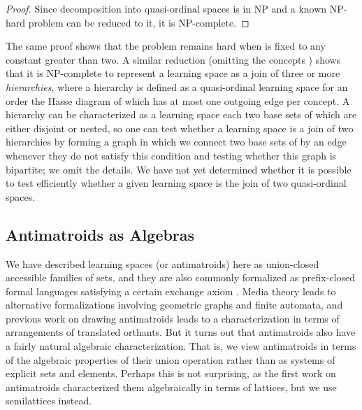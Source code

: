 \documentclass[11pt]{llncs}
\begin{document}
{\begin{proof}
Since decomposition into  quasi-ordinal spaces is in NP and a known NP-hard problem can be reduced to it, it is NP-complete.
\end{proof}

The same proof shows that the problem remains hard when  is fixed to any constant greater than two. A similar reduction (omitting the concepts ) shows that it is NP-complete to represent a learning space as a join of three or more \emph{hierarchies}, where a hierarchy is defined as a quasi-ordinal learning space for an order the Hasse diagram of which has at most one outgoing edge per concept. A hierarchy can be characterized as a learning space each two base sets of which are either disjoint or nested, so one can test whether a learning space  is a join of two hierarchies by forming a graph in which we connect two base sets of  by an edge whenever they do not satisfy this condition and testing whether this graph is bipartite; we omit the details. We have not yet determined whether it is possible to test efficiently whether a given learning space is the join of two quasi-ordinal spaces.

\subsection{Antimatroids as Algebras}

We have described learning spaces (or antimatroids) here as union-closed accessible families of sets, and they are also commonly formalized as prefix-closed formal languages satisfying a certain exchange axiom \citep{KorLovSch-91}. Media theory \citep{falma02,eppst07b} leads to alternative formalizations involving geometric graphs and finite automata, and previous work on drawing antimatroids \citep{eppst06} leads to a characterization in terms of arrangements of translated orthants. But it turns out that antimatroids also have a fairly natural algebraic characterization. That is, we view antimatroids in terms of the algebraic properties of their union operation rather than as systems of explicit sets and elements. Perhaps this is not surprising, as the first work on antimatroids \citep{dilworth40} characterized them algebraically in terms of lattices, but we use semilattices instead.

}
\end{document}
